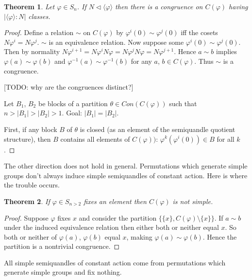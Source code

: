 \documentclass{amsart}
\newtheorem{thm}{Theorem}[section]
\theoremstyle{definition}
\numberwithin{equation}{section}
\begin{document}
\begin{thm}
Let $\varphi \in S_n$. If $N \lhd \langle\varphi\rangle$ then there is a congruence on
$C(\varphi)$ having $\left|\langle\varphi\rangle : N\right|$ classes.
\end{thm}

\begin{proof}
Define a relation $\sim$ on $C(\varphi)$ by $\varphi^{i}(0) \sim \varphi^{j}(0)$ iff the cosets $N\varphi^{i} = N\varphi^{j}$. $\sim$ is an equivalence relation. Now suppose some $\varphi^{i}(0) \sim \varphi^{j}(0)$. Then by normality $N\varphi^{i+1} = N\varphi^{i}N\varphi = N\varphi^{j}N\varphi = N\varphi^{j+1}$. Hence $a \sim b$ implies $\varphi(a) \sim \varphi(b)$ and $\varphi^{-1}(a) \sim \varphi^{-1}(b)$ for any $a$, $b \in C(\varphi)$. Thus $\sim$ is a congruence.

[TODO: why are the congruences distinct?]

\bigskip

Let $B_1$, $B_2$ be blocks of a partition $\theta \in Con(C(\varphi))$ such that $n > \left|B_1\right| > \left|B_2\right| > 1$. Goal: $\left|B_1\right| = \left|B_2\right|$.

\bigskip

First, if any block $B$ of $\theta$ is closed (as an element of the semiquandle quotient structure), then $B$ contains all elements of $C(\varphi))$: $\varphi^k(\varphi^i(0)) \in B$ for all $k$.

\bigskip


\end{proof}

The other direction does not hold in general. Permutations which generate simple groups don't
always induce simple semiquandles of constant action. Here is where the trouble occurs.

\begin{thm}
If $\varphi \in S_{n > 2}$ fixes an element then $C(\varphi)$ is not simple.
\end{thm}

\begin{proof}
Suppose $\varphi$ fixes $x$ and consider the partition $\{ \{x\}, C(\varphi) \setminus \{x\} \}$.
If $a \sim b$ under the induced equivalence relation then either both or neither equal $x$.
So both or neither of $\varphi(a)$, $\varphi(b)$ equal $x$, making $\varphi(a) \sim \varphi(b)$.
Hence the partition is a nontrivial congruence.
\end{proof}

All simple semiquandles of constant action come from permutations
which generate simple groups and fix nothing.
\end{document}
